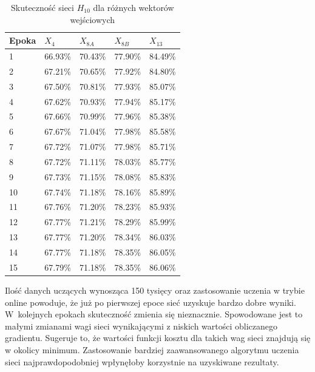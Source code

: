 \begin{table}
\centering
\caption{Skuteczność sieci $H_{10}$ dla różnych wektorów wejściowych}
\label{tab:xacc}
\begin{tabular}{|l|l|l|l|l|}
\hline
\textbf{Epoka} & \textbf{$X_4$} & \textbf{$X_{8A}$} & \textbf{$X_{8B}$} & \textbf{$X_{13}$} \\ \hline
1              & 66.93\%     & 70.43\%      & 77.90\%      & 84.49\%      \\ \hline
2              & 67.21\%     & 70.65\%      & 77.92\%      & 84.80\%      \\ \hline
3              & 67.50\%     & 70.81\%      & 77.93\%      & 85.07\%      \\ \hline
4              & 67.62\%     & 70.93\%      & 77.94\%      & 85.17\%      \\ \hline
5              & 67.66\%     & 70.99\%      & 77.96\%      & 85.38\%      \\ \hline
6              & 67.67\%     & 71.04\%      & 77.98\%      & 85.58\%      \\ \hline
7              & 67.72\%     & 71.07\%      & 77.98\%      & 85.71\%      \\ \hline
8              & 67.72\%     & 71.11\%      & 78.03\%      & 85.77\%      \\ \hline
9              & 67.73\%     & 71.15\%      & 78.08\%      & 85.83\%      \\ \hline
10             & 67.74\%     & 71.18\%      & 78.16\%      & 85.89\%      \\ \hline
11             & 67.76\%     & 71.20\%      & 78.23\%      & 85.93\%      \\ \hline
12             & 67.77\%     & 71.21\%      & 78.29\%      & 85.99\%      \\ \hline
13             & 67.77\%     & 71.20\%      & 78.34\%      & 86.03\%      \\ \hline
14             & 67.77\%     & 71.18\%      & 78.35\%      & 86.05\%      \\ \hline
15             & 67.79\%     & 71.18\%      & 78.35\%      & 86.06\%      \\ \hline
\end{tabular}
\end{table}

Ilość danych uczących wynosząca 150 tysięcy oraz zastosowanie uczenia w trybie online powoduje, że już po pierwszej epoce sieć uzyskuje bardzo dobre wyniki. W~kolejnych epokach skuteczność zmienia się nieznacznie. Spowodowane jest to małymi zmianami wagi sieci wynikającymi z niskich wartości obliczanego gradientu. Sugeruje to, że wartości funkcji kosztu dla takich wag sieci znajdują się w okolicy minimum. Zastosowanie bardziej zaawansowanego algorytmu uczenia sieci najprawdopodobniej wpłynęłoby korzystnie na uzyskiwane rezultaty.

